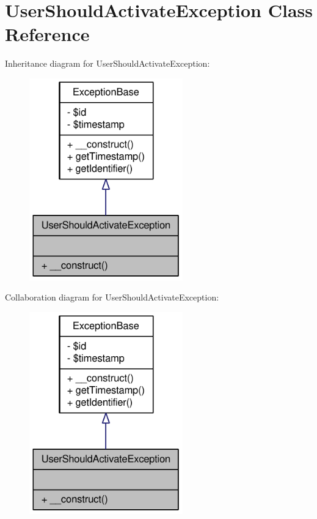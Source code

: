 \hypertarget{classUserShouldActivateException}{
\section{UserShouldActivateException Class Reference}
\label{classUserShouldActivateException}
}


Inheritance diagram for UserShouldActivateException:\nopagebreak
\begin{figure}[H]
\begin{center}
\leavevmode
\includegraphics[width=188pt]{classUserShouldActivateException__inherit__graph}
\end{center}
\end{figure}


Collaboration diagram for UserShouldActivateException:\nopagebreak
\begin{figure}[H]
\begin{center}
\leavevmode
\includegraphics[width=188pt]{classUserShouldActivateException__coll__graph}
\end{center}
\end{figure}
